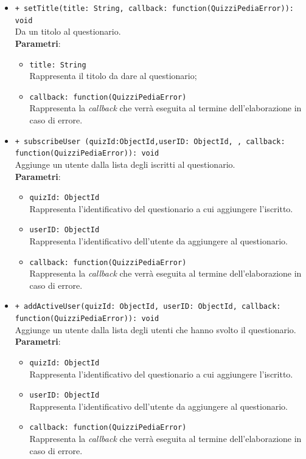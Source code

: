 \begin{itemize}
\begin{itemize}
			\item \texttt{+ setTitle(title: String, callback: function(QuizziPediaError)): void}\\ 		
			Da un titolo al questionario.\\
			\textbf{Parametri}:
			\begin{itemize}
				\item \texttt{title: String}\\
				Rappresenta il titolo da dare al questionario;
				\item \texttt{callback: function(QuizziPediaError)}\\
				Rappresenta la \textit{callback} che verrà eseguita al termine dell'elaborazione in caso di errore.
			\end{itemize}
			
			\item \texttt{+ subscribeUser (quizId:ObjectId,userID: ObjectId, , callback: function(QuizziPediaError)): void}\\
			Aggiunge un utente dalla lista degli iscritti al questionario.\\
			\textbf{Parametri}:
			\begin{itemize}
				\item \texttt{quizId: ObjectId}\\
				Rappresenta l'identificativo del questionario a  cui aggiungere l'iscritto.
				\item \texttt{userID: ObjectId}\\
				Rappresenta l'identificativo dell'utente da aggiungere al questionario.
				\item \texttt{callback: function(QuizziPediaError)}\\
				Rappresenta la \textit{callback} che verrà eseguita al termine dell'elaborazione in caso di errore.
			\end{itemize}
			
			\item \texttt{+ addActiveUser(quizId: ObjectId, userID: ObjectId, callback: function(QuizziPediaError)): void}\\
			Aggiunge un utente dalla lista degli utenti che hanno svolto il questionario.\\
			\textbf{Parametri}:
			\begin{itemize}
				\item \texttt{quizId: ObjectId}\\
				Rappresenta l'identificativo del questionario a  cui aggiungere l'iscritto.
				\item \texttt{userID: ObjectId}\\
				Rappresenta l'identificativo dell'utente da aggiungere al questionario.
				\item \texttt{callback: function(QuizziPediaError)}\\
				Rappresenta la \textit{callback} che verrà eseguita al termine dell'elaborazione in caso di errore.
			\end{itemize}
			

\end{itemize}
\end{itemize}
